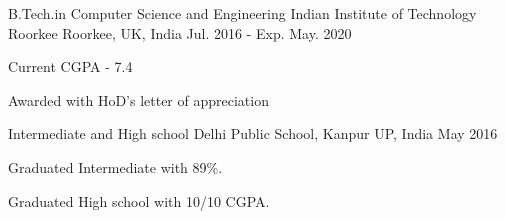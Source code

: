 

\begin{cventries}

  \cventry
    {B.Tech.in Computer Science and Engineering} %
    {Indian Institute of Technology Roorkee} %
    {Roorkee, UK, India} %
    {Jul. 2016 - Exp. May. 2020} %
    {
      \begin{cvitems} %
        \item {Current CGPA - 7.4}
        \item {Awarded with HoD's letter of appreciation}
      \end{cvitems}
    }

  \cventry
    {Intermediate and High school} %
    {Delhi Public School, Kanpur} %
    {UP, India} %
    {May 2016} %
    {
      \begin{cvitems} %
        \item {Graduated Intermediate with 89\%. }
         \item {Graduated High school with 10/10 CGPA. }
      \end{cvitems}
    }

\end{cventries}
